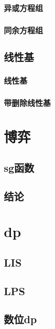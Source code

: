 \documentclass[a4paper,twocolumn]{article}
\begin{document}
\subsubsection{异或方程组}

\subsubsection{同余方程组}

\subsection{线性基}
\subsubsection{线性基}

\subsubsection{带删除线性基}

\section{博弈}
\subsection{sg函数}

\subsection{结论}
\begin{spacing}{1.5}

\end{spacing}
\section{dp}
\subsection{LIS}

\subsection{LPS}

\subsection{数位dp}

\end{document}
